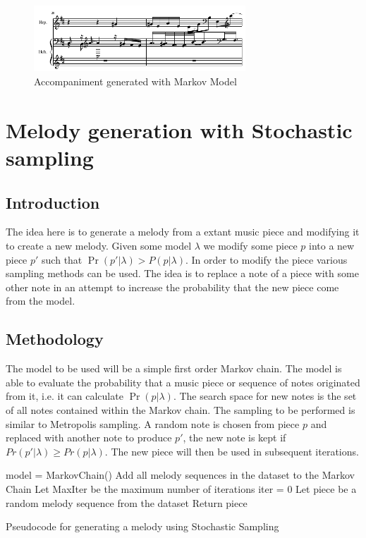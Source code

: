 \begin{figure}
\centerline{\includegraphics[width=300px]{../images/markov_model_accomp.pdf}}
\caption{Accompaniment generated with Markov Model}
\label{ims:hmm_accomp}
\end{figure}


\chapter{Melody generation with Stochastic sampling}
\section{Introduction}
The idea here is to generate a melody from a extant music piece and modifying it to create a new melody. Given some model $\lambda$ we modify some piece $p$ into a new piece $p'$ such that $\Pr(p'|\lambda) > P(p|\lambda)$.
In order to modify the piece various sampling methods can be used. The idea is to replace a note of a piece with some other note in an attempt to increase the probability that the new piece come from the model. 

\section{Methodology}
The model to be used will be a simple first order Markov chain. The model is able to evaluate the probability that a music piece or sequence of notes originated from it, i.e. it can calculate $\Pr(p|\lambda)$. The search space for new notes is the set of all notes contained within the Markov chain.
The sampling to be performed is similar to Metropolis sampling. A random note is chosen from piece $p$ and replaced with another note to produce $p'$, the new note is kept if $Pr(p'|\lambda) \geq Pr(p|\lambda)$. The new piece will then be used in subsequent iterations.

\begin{algorithm}
 model = MarkovChain()\;
 Add all melody sequences in the dataset to the Markov Chain\;
 Let MaxIter be the maximum number of iterations\;
 iter = 0\;
 Let piece be a random melody sequence from the dataset\;
 Return piece\;
 \caption{Pseudocode for generating a melody using Stochastic Sampling}
\end{algorithm}

